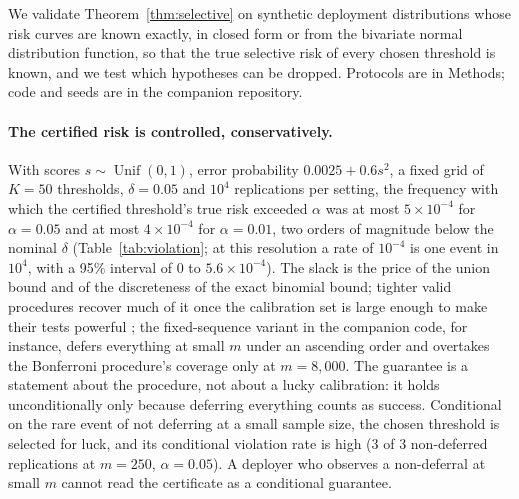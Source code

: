 \documentclass[11pt,letterpaper]{article}
\DeclareMathOperator{\Unif}{Unif}
\theoremstyle{plain}
\theoremstyle{definition}
\theoremstyle{remark}
\begin{document}
We validate Theorem~\ref{thm:selective} on synthetic deployment distributions whose risk curves are known exactly, in closed form or from the bivariate normal distribution function, so that the true selective risk of every chosen threshold is known, and we test which hypotheses can be dropped. Protocols are in Methods; code and seeds are in the companion repository.

\paragraph{The certified risk is controlled, conservatively.} With scores $s\sim\Unif(0,1)$, error probability $0.0025+0.6s^{2}$, a fixed grid of $K=50$ thresholds, $\delta=0.05$ and $10^{4}$ replications per setting, the frequency with which the certified threshold's true risk exceeded $\alpha$ was at most $5\times10^{-4}$ for $\alpha=0.05$ and at most $4\times10^{-4}$ for $\alpha=0.01$, two orders of magnitude below the nominal $\delta$ (Table~\ref{tab:violation}; at this resolution a rate of $10^{-4}$ is one event in $10^{4}$, with a 95\% interval of 0 to $5.6\times10^{-4}$). The slack is the price of the union bound and of the discreteness of the exact binomial bound; tighter valid procedures recover much of it once the calibration set is large enough to make their tests powerful \citep{angelopoulos2021ltt,basu2026}; the fixed-sequence variant in the companion code, for instance, defers everything at small $m$ under an ascending order and overtakes the Bonferroni procedure's coverage only at $m=8{,}000$. The guarantee is a statement about the procedure, not about a lucky calibration: it holds unconditionally only because deferring everything counts as success. Conditional on the rare event of not deferring at a small sample size, the chosen threshold is selected for luck, and its conditional violation rate is high (3 of 3 non-deferred replications at $m=250$, $\alpha=0.05$). A deployer who observes a non-deferral at small $m$ cannot read the certificate as a conditional guarantee.

\begin{table}[t]
\centering\small
\caption{\textbf{Frequency with which the certified threshold's true selective risk exceeds $\alpha$}, over $10^{4}$ calibration draws per cell, with the fraction of draws in which the procedure deferred everything in parentheses; deferring everything counts as success. Nominal bound $\delta=0.05$. The valid procedure is two orders of magnitude inside its bound. The sample-quantile grid does not raise the end-to-end rate here but invalidates the per-threshold statement on which the proof rests (text). Omitting the multiplicity correction raises the rate to as much as 3.1\% (0.8\% to 2.9\% at $\alpha=0.05$; up to 3.1\% at $\alpha=0.01$ once the procedure stops deferring everything), still under $\delta$ in this setting because the $K$ nested tests are positively dependent, but with no guarantee.}
\label{tab:violation}
\setlength{\tabcolsep}{3.5pt}\footnotesize

\end{table}
\end{document}
